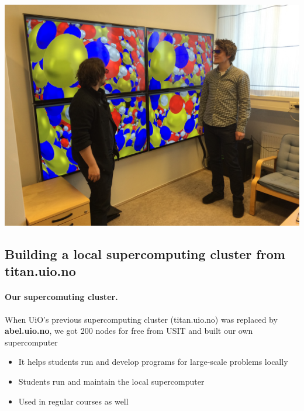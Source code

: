 \documentclass[%
twoside,                 %
final,                   %
10pt]{article}
\begin{document}
\noindent





\centerline{\includegraphics[width=1.0\linewidth]{fig-future/visualize.jpg}}






\subsection{Building a local supercomputing cluster from titan.uio.no}

\paragraph{Our supercomuting cluster.}
When UiO's previous supercomputing cluster (titan.uio.no) was replaced by \textbf{abel.uio.no}, we got 200 nodes for free from USIT and built our own supercomputer
\begin{itemize}
\item It helps students run and develop programs for large-scale problems locally

\item Students run and maintain the local supercomputer

\item Used in regular courses as well
\end{itemize}

\noindent
\end{document}
